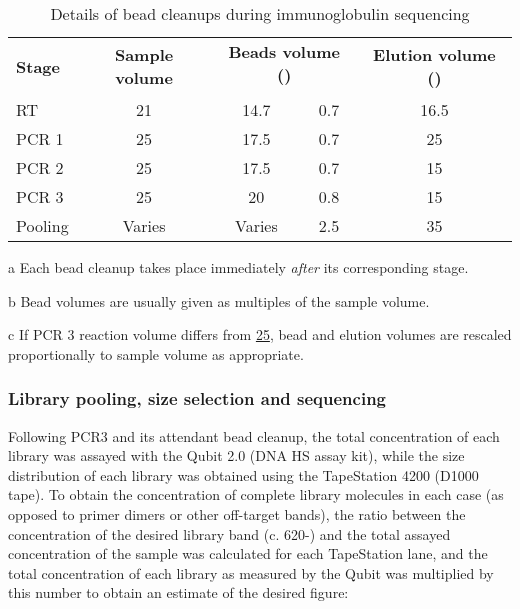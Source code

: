 \begin{table}[h]
\def\arraystretch{1.5}
\centering\small
\caption{Details of bead cleanups during \Nfu immunoglobulin sequencing}
\begin{threeparttable}
\begin{tabular}{l|c|cc|c}\toprule
\multirow{2}{*}{\textbf{Stage}\tnote{a}} & \multirow{2}{*}{\textbf{Sample volume}} & \multicolumn{2}{c|}{\textbf{Beads volume (\ul{})}} & \multirow{2}{*}{\textbf{Elution volume (\ul{})}}\\
& & \ul{} & \x{}\tnote{b} & \\\midrule
RT & 21 & 14.7 & 0.7 & 16.5\\
PCR 1 & 25 & 17.5 & 0.7 & 25\\
PCR 2 & 25 & 17.5 & 0.7 & 15\\
PCR 3 & 25\tnote{c} & 20\tnote{c} & 0.8 & 15\tnote{c}\\
Pooling & Varies & Varies & 2.5 & 35\\ 
\bottomrule
\end{tabular}
\begin{tablenotes}
\item[a] Each bead cleanup takes place immediately \textit{after} its corresponding stage.
\item[b] Bead volumes are usually given as multiples of the sample volume.
\item[c] If PCR 3 reaction volume differs from \ul{25}, bead and elution volumes are rescaled proportionally to sample volume as appropriate.
\end{tablenotes}
\label{tab:methods_igseq_beads}
\end{threeparttable}
\end{table}


\subsubsection{Library pooling, size selection and sequencing} 
\label{sec:methods_molec_igseq_seq}



Following PCR3 and its attendant bead cleanup, the total concentration of each library was assayed with the Qubit 2.0 (DNA HS assay kit), while the size distribution of each library was obtained using the TapeStation 4200 (D1000 tape). To obtain the concentration of complete library molecules in each case (as opposed to primer dimers or other off-target bands), the ratio between the concentration of the desired library band (c. 620-) and the total assayed concentration of the sample was calculated for each TapeStation lane, and the total concentration of each library as measured by the Qubit was multiplied by this number to obtain an estimate of the desired figure:

